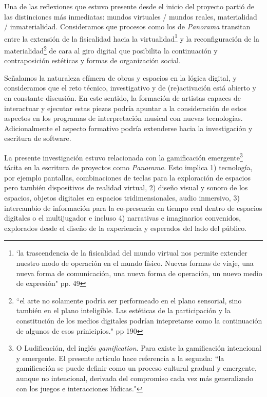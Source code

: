 \color{BlueViolet}

Una de las reflexiones que estuvo presente desde el inicio del proyecto partió de las distinciones más inmediatas: mundos virtuales / mundos reales, materialidad / inmaterialidad. Consideramos que procesos como los de \textit{Panorama} transitan entre la extensión de la fisicalidad hacia la virtualidad\footnote{`la trascendencia de la fisicalidad del mundo virtual nos permite extender nuestro modo de operación en el mundo físico. Nuevas formas de viaje, una nueva forma de comunicación, una nueva forma de operación, un nuevo medio de expresión" pp. 49} \citep{cyberspace} y la reconfiguración de la materialidad\footnote{``el arte no solamente podría ser performeado en el plano sensorial, sino también en el plano inteligible. Las estéticas de la participación y la constitución de los medios digitales podrían intepretarse como la continuación de algunos de esos prinicipios." pp 190} \citep{andreasosa} de cara al giro digital que posibilita la continuación y contraposición estéticas y formas de organización social. 

\color{MidnightBlue}

Señalamos la naturaleza efímera de obras y espacios en la lógica digital, y consideramos que el reto técnico, investigativo y de (re)activación está abierto y en constante discusión. En este sentido, la formación de artistas capaces de interactuar y ejecutar estas piezas podría apuntar a la consideración de estos aspectos en los programas de interpretación musical con nuevas tecnologías. Adicionalmente el aspecto formativo podría extenderse hacia la investigación y escritura de software.  %


\color{BlueGreen}

La presente investigación estuvo relacionada con la gamificación emergente\footnote{O Ludificación, del inglés \textit{gamification}. Para \cite{gamificacion} existe la gamificación intencional y emergente. El presente artículo hace referencia a la segunda: ``la gamificación se puede definir como un proceso cultural gradual y emergente, aunque no intencional, derivada del compromiso cada vez más generalizado con los juegos e interacciones lúdicas."} tácita en la escritura de proyectos como \textit{Panorama}. Esto implica 1) tecnología, por ejemplo pantallas, combinaciones de teclas para la exploración de espacios pero también dispositivos de realidad virtual, 2) diseño visual y sonoro de los espacios, objetos digitales en espacios tridimensionales, audio inmersivo, 3) intercambio de información para la co-presencia en tiempo real dentro de espacios digitales o el multijugador e incluso 4) narrativas e imaginarios convenidos, explorados desde el diseño de la experiencia y esperados del lado del público. 

